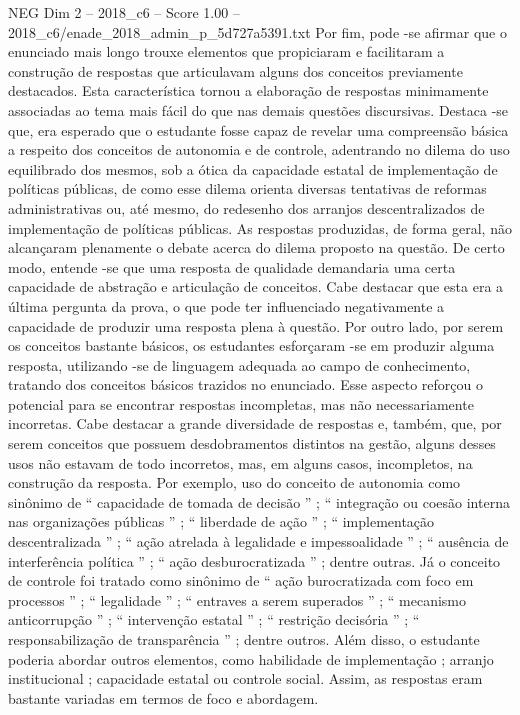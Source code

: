 \begin{textsample}{NEG Dim 2 – 2018\_c6 – Score 1.00 – 2018\_c6/enade\_2018\_admin\_p\_5d727a5391.txt}
Por fim, pode -se afirmar que o enunciado mais longo trouxe elementos que propiciaram e facilitaram a construção de respostas que articulavam alguns dos conceitos previamente destacados.
Esta característica tornou a elaboração de respostas minimamente associadas ao tema mais fácil do que nas demais questões discursivas.
Destaca -se que, era esperado que o estudante fosse capaz de revelar uma compreensão básica a respeito dos conceitos de autonomia e de controle, adentrando no dilema do uso equilibrado dos mesmos, sob a ótica da capacidade estatal de implementação de políticas públicas, de como esse dilema orienta diversas tentativas de reformas administrativas ou, até mesmo, do redesenho dos arranjos descentralizados de implementação de políticas públicas.
As respostas produzidas, de forma geral, não alcançaram plenamente o debate acerca do dilema proposto na questão.
De certo modo, entende -se que uma resposta de qualidade demandaria uma certa capacidade de abstração e articulação de conceitos.
Cabe destacar que esta era a última pergunta da prova, o que pode ter influenciado negativamente a capacidade de produzir uma resposta plena à questão.
Por outro lado, por serem os conceitos bastante básicos, os estudantes esforçaram -se em produzir alguma resposta, utilizando -se de linguagem adequada ao campo de conhecimento, tratando dos conceitos básicos trazidos no enunciado.
Esse aspecto reforçou o potencial para se encontrar respostas incompletas, mas não necessariamente incorretas.
Cabe destacar a grande diversidade de respostas e, também, que, por serem conceitos que possuem desdobramentos distintos na gestão, alguns desses usos não estavam de todo incorretos, mas, em alguns casos, incompletos, na construção da resposta.
Por exemplo, uso do conceito de autonomia como sinônimo de “ capacidade de tomada de decisão ” ; “ integração ou coesão interna nas organizações públicas ” ; “ liberdade de ação ” ; “ implementação descentralizada ” ; “ ação atrelada à legalidade e impessoalidade ” ; “ ausência de interferência política ” ; “ ação desburocratizada ” ; dentre outras.
Já o conceito de controle foi tratado como sinônimo de “ ação burocratizada com foco em processos ” ; “ legalidade ” ; “ entraves a serem superados ” ; “ mecanismo anticorrupção ” ; “ intervenção estatal ” ; “ restrição decisória ” ; “ responsabilização de transparência ” ; dentre outros.
Além disso, o estudante poderia abordar outros elementos, como habilidade de implementação ; arranjo institucional ; capacidade estatal ou controle social.
Assim, as respostas eram bastante variadas em termos de foco e abordagem.

\end{textsample}
